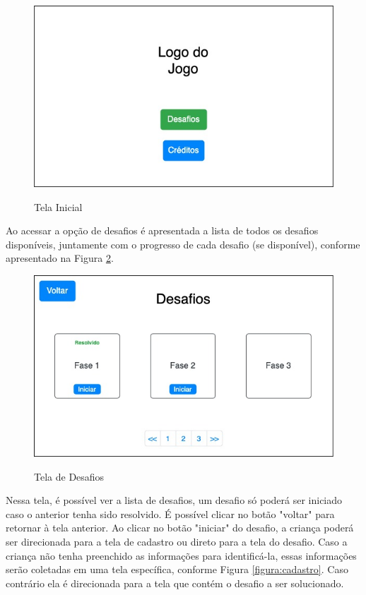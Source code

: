     \begin{figure}[H]
        \caption{Tela Inicial}
        \centering
        \includegraphics[width=\linewidth]{Imagens/Cap3/Tela Inicial.jpg}
        \label{figura:tela_inicial}
    \end{figure}
    
    Ao acessar a opção de desafios é apresentada a lista de todos os desafios disponíveis, juntamente com o progresso de cada desafio (se disponível), conforme apresentado na Figura \ref{figura:tela_desafios}.
    
    \begin{figure}[H]
        \caption{Tela de Desafios}
        \centering
        \includegraphics[width=\linewidth]{Imagens/Cap3/tela_desafios.jpg}
        \label{figura:tela_desafios}
    \end{figure}
    
    Nessa tela, é possível ver a lista de desafios, um desafio só poderá ser iniciado caso o anterior tenha sido resolvido.
    É possível clicar no botão "voltar" para retornar à tela anterior. Ao clicar no botão "iniciar" do desafio, a criança poderá ser direcionada para a tela de cadastro ou direto para a tela do desafio. Caso a criança não tenha preenchido as informações para identificá-la, essas informações serão coletadas em uma tela específica, conforme Figura \ref{figura:cadastro}. Caso contrário ela é direcionada para a tela que contém o desafio a ser solucionado.
    
